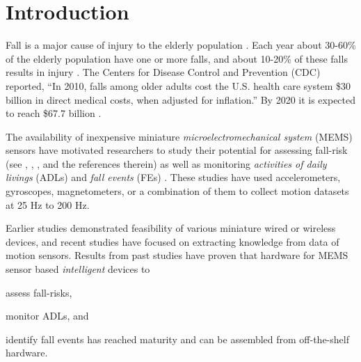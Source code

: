 \documentclass[]{IEEEtran}
\begin{document}
\section{Introduction}
\label{sec:Intro}
Fall is a major cause of injury to the elderly population
\cite{Rubenstein2006}.  Each year about 30-60\% of the elderly population have
one or more falls, and  about 10-20\% of these falls results in injury
\cite{Rubenstein2006}.  The Centers for Disease Control and Prevention (CDC)
reported, ``In 2010, falls among older adults cost the U.S. health care system
\$30 billion in direct medical costs, when adjusted for inflation.'' By 2020 it
is expected to reach \$67.7 billion \cite{CDC2014July}.  \par The availability
of inexpensive miniature \emph{microelectromechanical system} (MEMS) sensors
have motivated researchers  to study their potential for assessing fall-risk
(see \cite{howcroftReview2013}, \cite{MukReview15}, \cite{shanyReview2012}, and
the references therein) as well as monitoring \emph{activities of daily
livings} (ADLs)
\cite{MukReview15,d2014simple,kan2012wearable,alvarezActivityAndFallRecognotion2015,BaoActivityrecognition2004,DernbachActivityAndFallDetectionPhone2012,krishnanActivityRecognition2014,kumarActivitAndFallDetection2013}
and \emph{fall events} (FEs)
\cite{baekFallDetection2013,baiFallDetectionPhone2013,DernbachActivityAndFallDetectionPhone2012,shany2012sensors,ranhotigmage2013human,dumitracheFallDetection2013,kumarActivitAndFallDetection2013,leoneFallDetection2013,liangFallDetection2012,liFallDetection2009,moyaFallAndDamageDetection2015,ojetolaFallDetection2011,ShenFallDetectionPhone2015,steidlFallDetection2012,DoukasFallDetection2011,ErdoganFallDetection2014,JianFallDetection2015,aziz2011analysis}.
These studies have used accelerometers, gyroscopes, magnetometers, or a
combination of them to collect motion datasets at  25 Hz to 200 Hz.  \par
Earlier studies demonstrated feasibility of various miniature wired or wireless
devices, and recent studies have focused on extracting knowledge from data of
motion sensors.  Results from past studies have proven  that hardware for MEMS
sensor based \emph{intelligent} devices to \begin{inparaenum} [($i$)] \item
assess fall-risks, \item monitor ADLs, and \item identify fall events has
reached maturity and can be assembled from off-the-shelf hardware.
\end{inparaenum}   
\end{document}
